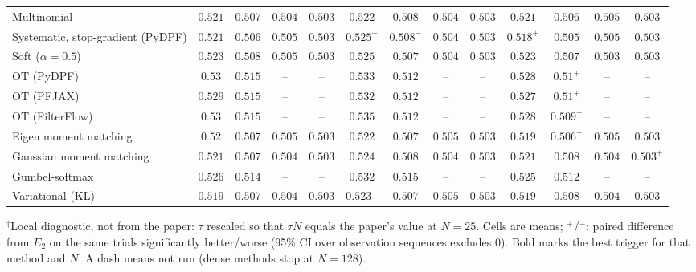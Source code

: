 \begin{table}[ht]
\begin{adjustbox}{max width=\linewidth}
\begin{tabular}{lcccc|cccc|cccc}
Multinomial & $0.521$ & $0.507$ & $\mathbf{0.504}$ & $0.503$ & $0.522$ & $0.508$ & $0.504$ & $\mathbf{0.503}$ & $\mathbf{0.521}$ & $\mathbf{0.506}$ & $0.505$ & $0.503$ \\
Systematic, stop-gradient (PyDPF) & $0.521$ & $0.506$ & $0.505$ & $0.503$ & $0.525^{-}$ & $0.508^{-}$ & $\mathbf{0.504}$ & $\mathbf{0.503}$ & $\mathbf{0.518}^{+}$ & $\mathbf{0.505}$ & $0.505$ & $0.503$ \\
Soft ($\alpha{=}0.5$) & $0.523$ & $0.508$ & $0.505$ & $\mathbf{0.503}$ & $0.525$ & $\mathbf{0.507}$ & $0.504$ & $0.503$ & $\mathbf{0.523}$ & $0.507$ & $\mathbf{0.503}$ & $0.503$ \\
OT (PyDPF) & $0.53$ & $0.515$ & -- & -- & $0.533$ & $0.512$ & -- & -- & $\mathbf{0.528}$ & $\mathbf{0.51}^{+}$ & -- & -- \\
OT (PFJAX) & $0.529$ & $0.515$ & -- & -- & $0.532$ & $0.512$ & -- & -- & $\mathbf{0.527}$ & $\mathbf{0.51}^{+}$ & -- & -- \\
OT (FilterFlow) & $0.53$ & $0.515$ & -- & -- & $0.535$ & $0.512$ & -- & -- & $\mathbf{0.528}$ & $\mathbf{0.509}^{+}$ & -- & -- \\
Eigen moment matching & $0.52$ & $0.507$ & $0.505$ & $0.503$ & $0.522$ & $0.507$ & $0.505$ & $\mathbf{0.503}$ & $\mathbf{0.519}$ & $\mathbf{0.506}^{+}$ & $\mathbf{0.505}$ & $\mathbf{0.503}$ \\
Gaussian moment matching & $0.521$ & $\mathbf{0.507}$ & $0.504$ & $0.503$ & $0.524$ & $0.508$ & $0.504$ & $0.503$ & $\mathbf{0.521}$ & $0.508$ & $\mathbf{0.504}$ & $\mathbf{0.503}^{+}$ \\
Gumbel-softmax & $0.526$ & $0.514$ & -- & -- & $0.532$ & $0.515$ & -- & -- & $\mathbf{0.525}$ & $\mathbf{0.512}$ & -- & -- \\
Variational (KL) & $\mathbf{0.519}$ & $\mathbf{0.507}$ & $0.504$ & $\mathbf{0.503}$ & $0.523^{-}$ & $0.507$ & $0.505$ & $0.503$ & $0.519$ & $0.508$ & $\mathbf{0.504}$ & $0.503$ \\
\bottomrule
\end{tabular}
\end{adjustbox}
\par\smallskip\parbox{0.95\linewidth}{\footnotesize $^\dagger$Local diagnostic, not from the paper: $\tau$ rescaled so that $\tau N$ equals the paper's value at $N{=}25$. Cells are means; $^{+}$/$^{-}$: paired difference from $E_2$ on the same trials significantly better/worse (95\% CI over observation sequences excludes 0). Bold marks the best trigger for that method and $N$. A dash means not run (dense methods stop at $N{=}128$).}
\end{table}

